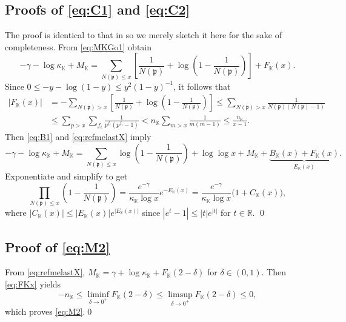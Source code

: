 \documentclass[10pt,reqno]{amsart}
\theoremstyle{plain}
\theoremstyle{definition}
\newcommand{\R}{\mathbb{R}}
\newcommand{\K}{\mathbb{K}}
\newcommand{\PP}{\mathfrak{p}}
\begin{document}
\subsection{Proofs of \eqref{eq:C1} and \eqref{eq:C2}}
The proof is identical to that in \cite{EMT4NF1} so we merely sketch it here for the sake of completeness.
From \eqref{eq:MKGo1} obtain
\begin{equation}\label{eq:refmelastX}
    -\gamma - \log{\kappa_{\K}} + M_{\K} 
    = \sum_{N(\PP) \leq x}\left[\frac{1}{N(\PP)} + \log\left(1 - \frac{1}{N(\PP)}\right)\right] + F_{\K}(x).
\end{equation}
Since $0 \leq -y -\log(1-y) \leq  y^2(1-y)^{-1}$, it follows that
\begin{align}
| F_{\K}(x)|
&=- \sum_{N(\PP) > x}\left[\frac{1}{N(\PP)} + \log\left(1 - \frac{1}{N(\PP)}\right)\right] 
\leq \sum_{N(\PP) > x}\frac{1}{N(\PP) (N(\PP) - 1)} \nonumber \\
&\leq \sum_{p > x}\sum_{f_i}\frac{1}{p^{f_i} (p^{f_i} - 1)} 
< n_{\K}\sum_{m > x}\frac{1}{m (m - 1)}  
\leq \frac{n_{\K}}{ x-1 }. \label{eq:FKx}
\end{align}
Then \eqref{eq:B1} and \eqref{eq:refmelastX} imply
\begin{equation*}
-\gamma - \log{\kappa_{\K}} + M_{\K} =  \sum_{N(\PP) \leq x} \log\left(1 - \frac{1}{N(\PP)}\right) + \log\log{x} + M_{\K} +
\underbrace{B_{\K}(x) + F_{\K}(x)}_{E_{\K}(x)}.
\end{equation*}
Exponentiate and simplify to get
\begin{equation*}
    \prod_{N(\PP) \leq x} \left(1 - \frac{1}{N(\PP)}\right) 
    = \frac{e^{- \gamma}}{\kappa_{\K} \log{x}} e^{-E_{\K}(x)}
    = \frac{e^{- \gamma}}{\kappa_{\K} \log{x}}\big(1 + C_{\K}(x) \big),
\end{equation*}
where $|C_{\K}(x)| \leq  |E_{\K}(x)| e^{ |E_{\K}(x)|}$ since
$|e^t - 1|  \leq |t| e^{|t|}$ for $t \in \R$. \qed

\subsection{Proof of \eqref{eq:M2}}
From \eqref{eq:refmelastX}, 
$M_{\K} = \gamma + \log\kappa_{\K} + F_{\K}(2-\delta)$ for $\delta \in (0,1)$.  Then
\eqref{eq:FKx} yields
$$- n_{\K} \leq \liminf_{\delta\to0^+}F_{\K}(2-\delta) \leq \limsup_{\delta\to0^+}F_{\K}(2-\delta)\leq 0,$$
which proves \eqref{eq:M2}.\qed



\end{document}
